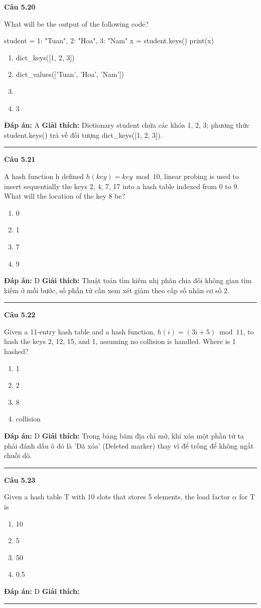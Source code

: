 \documentclass[11pt,a4paper]{article}
\newenvironment{question}[1]{%
  \par\vspace{1em}\noindent\textbf{\large Câu #1}\par\vspace{0.4em}
}{%
  \par\vspace{1em}\hrule\vspace{0.6em}
}
\newenvironment{choices}{%
  \begin{enumerate}[label=\textbf{\Alph*.},leftmargin=2.2em,itemsep=2pt,topsep=3pt]
}{%
  \end{enumerate}
}
\newcommand{\choice}{\item}
\newenvironment{codebox}{%
  \begin{tcolorbox}[colback=gray!8!white,colframe=gray!50!black,arc=1.5mm,boxrule=0.6pt,left=3mm,right=3mm,top=2.5mm,bottom=2.5mm]
  \ttfamily\small
}{%
  \end{tcolorbox}
}
\begin{document}
\begin{question}{5.20}
What will be the output of the following code?
\begin{codebox}
student = {
  1: "Tuan",
  2: "Hoa",
  3: "Nam"
}
x = student.keys()
print(x)
\end{codebox}
\begin{choices}
\choice dict_keys([1, 2, 3])
\choice dict_values(['Tuan', 'Hoa', 'Nam'])
\choice [1: "Tuan", 2: "Hoa", 3: "Nam"]
\choice 3
\end{choices}
\textbf{Đáp án:} A
\textbf{Giải thích:} Dictionary student chứa các khóa 1, 2, 3; phương thức student.keys() trả về đối tượng dict_keys([1, 2, 3]).
\end{question}

\begin{question}{5.21}
A hash function h defined \(h(key) = key \bmod 10\), linear probing is used to insert sequentially the keys 2, 4, 7, 17 into a hash table indexed from 0 to 9. What will the location of the key 8 be?
\begin{choices}
\choice 0
\choice 1
\choice 7
\choice 9
\end{choices}
\textbf{Đáp án:} D
\textbf{Giải thích:} Thuật toán tìm kiếm nhị phân chia đôi không gian tìm kiếm ở mỗi bước, số phần tử cần xem xét giảm theo cấp số nhân cơ số 2.
\end{question}

\begin{question}{5.22}
Given a 11-entry hash table and a hash function, \(h(i) = (3i + 5) \bmod 11\), to hash the keys 2, 12, 15, and 1, assuming no collision is handled. Where is 1 hashed?
\begin{choices}
\choice 1
\choice 2
\choice 8
\choice collision
\end{choices}
\textbf{Đáp án:} D
\textbf{Giải thích:} Trong bảng băm địa chỉ mở, khi xóa một phần tử ta phải đánh dấu ô đó là 'Đã xóa' (Deleted marker) thay vì để trống để không ngắt chuỗi dò.
\end{question}

\begin{question}{5.23}
Given a hash table T with 10 slots that stores 5 elements, the load factor \(\alpha\) for T is
\begin{choices}
\choice 10
\choice 5
\choice 50
\choice 0.5
\end{choices}
\textbf{Đáp án:} D
\textbf{Giải thích:} 
\end{question}
\end{document}
